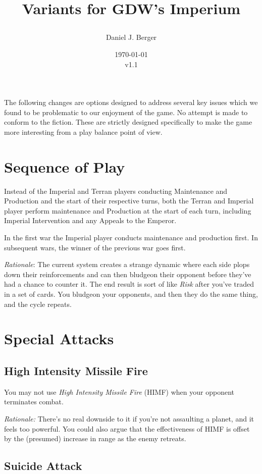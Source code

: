 \documentclass[a4paper,11pt]{article}
\title{%
  Variants for GDW's Imperium  \\
  \vspace{0.5em}
  \date{\today\\v1.1}
}
\author{Daniel J. Berger}
\begin{document}
\maketitle

The following changes are options designed to address several key issues which we found to be problematic to our enjoyment of the game. No attempt is made to conform to the fiction. These are strictly designed specifically to make the game more interesting from a play balance point of view.

\section{Sequence of Play}

Instead of the Imperial and Terran players conducting Maintenance and Production and the start of their respective turns, both the Terran and Imperial player perform maintenance and Production at the start of each turn, including Imperial Intervention and any Appeals to the Emperor.

In the first war the Imperial player conducts maintenance and production first. In subsequent wars, the winner of the previous war goes first.

\textit{Rationale}: The current system creates a strange dynamic where each side plops down their reinforcements and can then bludgeon their opponent before they've had a chance to counter it. The end result is sort of like \textit{Risk} after you've traded in a set of cards. You bludgeon your opponents, and then they do the same thing, and the cycle repeats.

\section{Special Attacks}

\subsection{High Intensity Missile Fire}

You may not use \textit{High Intensity Missile Fire} (HIMF) when your opponent terminates combat.

\textit{Rationale:} There's no real downside to it if you're not assaulting a planet, and it feels too powerful. You could also argue that the effectiveness of HIMF is offset by the (presumed) increase in range as the enemy retreats.

\subsection{Suicide Attack}
\end{document}
